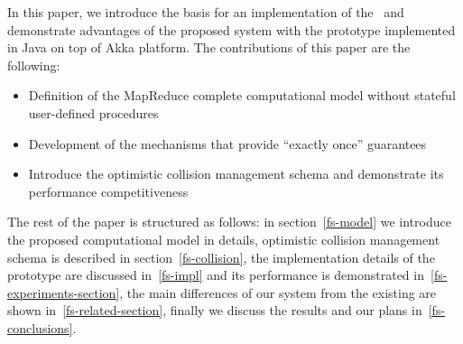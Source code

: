 In this paper, we introduce the basis for an implementation of the \FlameStream\ and demonstrate advantages of the proposed system with the prototype implemented in Java on top of Akka platform. The contributions of this paper are the following:

\begin {itemize}
\item Definition of the MapReduce complete computational model without stateful user-defined procedures
\item Development of the mechanisms that provide ``exactly once'' guarantees
\item Introduce the optimistic collision management schema and demonstrate its performance competitiveness
\end {itemize}

The rest of the paper is structured as follows: in section~\ref{fs-model} we introduce the proposed computational model in details, optimistic collision management schema is described in section~\ref{fs-collision}, the implementation details of the prototype are discussed in~\ref{fs-impl} and its performance is demonstrated in~\ref{fs-experiments-section}, the main differences of our system from the existing are shown in~\ref{fs-related-section}, finally we discuss the results and our plans in~\ref{fs-conclusions}.

\endinput
